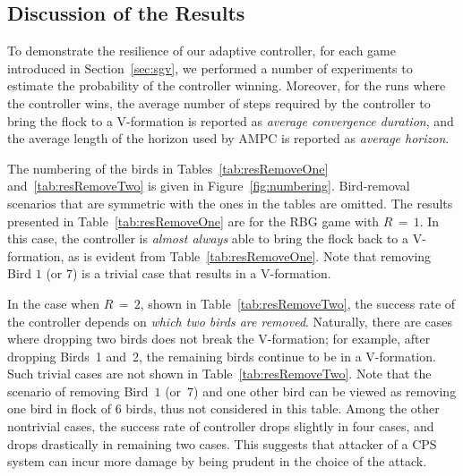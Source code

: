 \subsection{Discussion of the Results}
To demonstrate the resilience of our adaptive controller, for each game introduced in Section~\ref{sec:sgv}, we performed a number of experiments to estimate the probability of the controller winning.  Moreover, for the runs where the controller wins, the average number of steps required by the controller to bring the flock to a V-formation is reported as {\em{average convergence duration}}, and the average length of the horizon used by AMPC is reported as {\em{average horizon}}.

The numbering of the birds in Tables~\ref{tab:resRemoveOne} and~\ref{tab:resRemoveTwo} is given in Figure~\ref{fig:numbering}. Bird-removal scenarios that are symmetric with the ones in the tables are omitted. The results presented in Table~\ref{tab:resRemoveOne} are for the RBG game with $R\,{=}\,1$.
In this case, the controller is {\em{almost always}} able to bring the flock back to a V-formation, as is evident from Table~\ref{tab:resRemoveOne}. Note that removing Bird $1$ (or $7$) is a trivial case that results in a V-formation.

In the case when $R\,{=}\,2$, shown in Table~\ref{tab:resRemoveTwo}, the success rate of the controller depends on {\em{which two birds are removed}}. Naturally, there are cases where dropping two birds does not break the V-formation; for example, after dropping Birds~1 and~2, the remaining birds continue to be in a V-formation.  Such trivial cases are not shown in Table~\ref{tab:resRemoveTwo}. Note that the scenario of removing Bird~$1$ (or~$7$) and one other bird can be viewed as removing one bird in flock of $6$ birds, thus not considered in this table. Among the other nontrivial cases, the success rate of controller drops slightly in four cases, and drops drastically in remaining two cases. 
This suggests that attacker of a CPS system can incur more damage by being prudent in the choice of the attack. 

